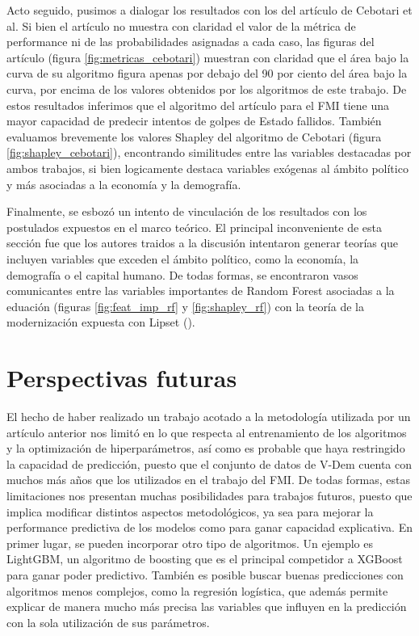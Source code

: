 \documentclass{article}
\begin{document}
Acto seguido, pusimos a dialogar los resultados con los del artículo de Cebotari et al. Si bien el artículo
no muestra con claridad el valor de la métrica de performance ni de las probabilidades asignadas a cada caso,
las figuras del artículo (figura \ref{fig:metricas_cebotari}) muestran con claridad que el área bajo la curva
de su algoritmo figura apenas por debajo del 90 por ciento del área bajo la curva, por encima de los
valores obtenidos por los algoritmos de este trabajo. De estos resultados inferimos que el algoritmo del 
artículo para el FMI tiene una mayor capacidad de predecir intentos de golpes de Estado fallidos. También
evaluamos brevemente los valores Shapley del algoritmo de Cebotari (figura \ref{fig:shapley_cebotari}), 
encontrando similitudes entre las variables destacadas por ambos trabajos, si bien logicamente destaca 
variables exógenas al ámbito político y más asociadas a la economía y la demografía.

Finalmente, se esbozó un intento de vinculación de los resultados con los postulados expuestos en el marco
teórico. El principal inconveniente de esta sección fue que los autores traidos a la discusión intentaron
generar teorías que incluyen variables que exceden el ámbito político, como la economía,
la demografía o el capital humano. De todas formas, se encontraron vasos comunicantes entre las variables
importantes de Random Forest asociadas a la eduación (figuras \ref{fig:feat_imp_rf} y \ref{fig:shapley_rf})
con la teoría de la modernización expuesta con Lipset (\citeyear{lipset1959some}).

\section{Perspectivas futuras}
El hecho de haber realizado un trabajo acotado a la metodología utilizada por un artículo anterior
nos limitó en lo que respecta al entrenamiento de los algoritmos y la optimización
de hiperparámetros, así como es probable que haya restringido la capacidad de predicción, puesto que el 
conjunto de datos de V-Dem cuenta con muchos más años que los utilizados en 
el trabajo del FMI. De todas formas, estas limitaciones nos presentan muchas posibilidades para trabajos 
futuros, puesto que implica modificar distintos aspectos 
metodológicos, ya sea para mejorar la performance predictiva de los modelos como para ganar capacidad
explicativa. En primer lugar, se pueden incorporar otro tipo de algoritmos. Un ejemplo es LightGBM, un 
algoritmo de boosting que es el principal competidor a XGBoost para ganar poder predictivo. También es 
posible buscar buenas predicciones con algoritmos menos complejos, como la regresión logística, que además 
permite explicar de manera mucho más precisa las variables que influyen en la predicción con la sola 
utilización de sus parámetros.
\end{document}
